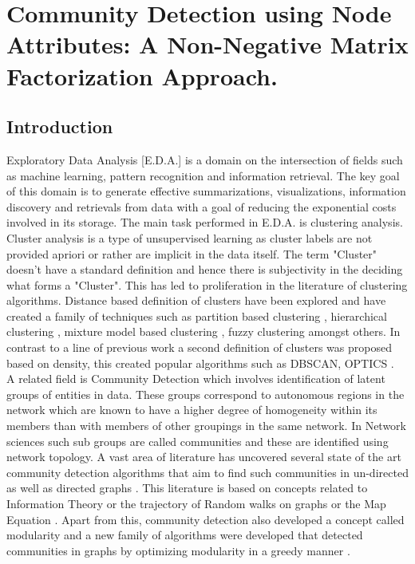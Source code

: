 \chapter{Community Detection using Node Attributes: A Non-Negative Matrix Factorization Approach.}


\section{Introduction}
Exploratory Data Analysis [E.D.A.] is a domain on the
intersection of fields such as machine learning, pattern
recognition and information retrieval. The key goal of this
domain is to generate effective summarizations, visualizations,
information discovery and retrievals from data with a goal of reducing the exponential
costs involved in its storage. The main task performed in E.D.A. is
clustering analysis. Cluster analysis is a type of unsupervised
learning as cluster labels are not provided apriori or rather
are implicit in the data itself. The term "Cluster" doesn't have a
standard definition and hence there is subjectivity in the
deciding what forms a "Cluster". This has led to proliferation in the literature of clustering algorithms. Distance based definition of clusters have been explored
and have created a family of techniques such as partition
based clustering \cite{aps:3} , hierarchical clustering \cite{aps:4}, mixture
model based clustering \cite{aps:4}, fuzzy clustering \cite{aps:8} amongst
others. In contrast to a line of previous work a second
definition of clusters was proposed based on density, this
created popular algorithms such as DBSCAN, OPTICS \cite{aps:46}.\\

A related field is Community Detection which involves
identification of latent groups of entities in data. These groups
correspond to autonomous regions in the network which are known to have a higher
degree of homogeneity within its members than with members
of other groupings in the same network. In Network sciences such sub
groups are called communities and these are identified using
network topology. A vast area of literature has uncovered
several state of the art community detection algorithms that
aim to find such communities in un-directed as well as
directed graphs \cite{aps:2} . This literature is based
on concepts related to Information Theory or the trajectory of Random walks
on graphs or the Map Equation \cite{aps:10} \cite{aps:9}. Apart from
this, community detection also developed a concept called
modularity and a new family of algorithms were developed
that detected communities in graphs by optimizing modularity in a greedy manner \cite{aps:2} \cite{aps:8}.\\

